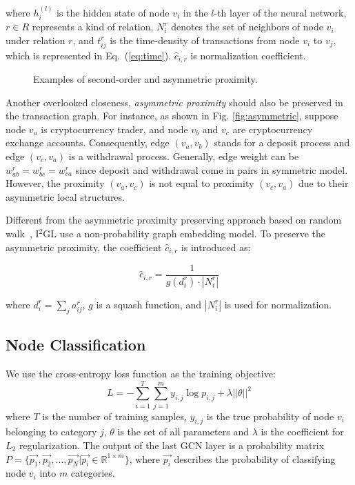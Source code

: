 \noindent where $h_i^{(l)}$ is the hidden state of node $v_i$ in the $l$-th layer of the neural network, $r \in R$ represents a kind of relation, $N_i^r$ denotes the set of neighbors of node $v_i$ under relation $r$, and $t_{ij}^r$ is the time-density of transactions from node $v_i$ to $v_j$, which is represented in Eq.~(\ref{eq:time}). $\hat c_{i,r}$ is normalization coefficient. 


\begin{figure}[htbp]
	\centering
	\caption{Examples of second-order and asymmetric proximity.}

\end{figure}


Another overlooked closeness, \emph{asymmetric proximity} should also be preserved in the transaction graph. For instance, as shown in Fig. \ref{fig:asymmetric}, suppose node $v_a$ is cryptocurrency trader, and node $v_b$ and $v_c$ are cryptocurrency exchange accounts. Consequently, edge $(v_a,v_b)$ stands for a deposit process and edge $(v_c,v_a)$ is a withdrawal process. Generally, edge weight can be $w^r_{ab}=w^r_{bc}=w^r_{ca}$ since deposit and withdrawal come in pairs in symmetric model. However, the proximity $(v_a,v_c)$ is not equal to proximity $(v_c,v_a)$ due to their asymmetric local structures.

Different from the asymmetric proximity preserving approach based on random walk~\cite{zhou2017scalable}, I$^2$GL use a non-probability graph embedding model. To preserve the asymmetric proximity, the coefficient $\hat c_{i,r}$ is introduced as:

\begin{equation}
\hat c_{i,r}=\frac{1}{g(d_i^r)\cdot |N_i^r|}
\end{equation}

\noindent where $d_i^r=\sum_{j}a^r_{ij}$, $g$ is a squash function, and $|N_i^r|$ is used for normalization.



\subsection{Node Classification}
We use the cross-entropy loss function as the training objective:
\begin{equation}
L=-\sum_{i=1}^T\sum_{j=1}^m y_{i,j}\log p_{i,j}+\lambda ||\theta||^2
\end{equation}
where $T$ is the number of training samples, $y_{i,j}$ is the true probability of node $v_i$ belonging to category $j$, $\theta$ is the set of all parameters and $\lambda$ is the coefficient for $L_2$  regularization. The output of the last GCN layer is a probability matrix $P=\{\vec{p_1},\vec{p_2},...,\vec{p_N}|\vec{p_i}\in \mathbb{R}^{1 \times m}\}$, where $\vec{p_i}$ describes the probability of classifying node $v_i$ into $m$ categories.
